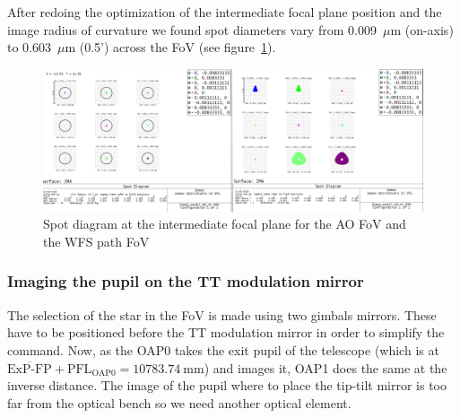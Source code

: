 \documentclass[12pt,a4paper]{article}
\begin{document}
After redoing the optimization of the intermediate focal plane position and the image radius of curvature we found spot diameters vary from 0.009~$\mu$m (on-axis) to 0.603~$\mu$m (0.5') across the FoV (see figure~\ref{fig:IntermediateFP_SpotDiagram}).\\
\begin{figure}[H]
	\begin{center}
		\includegraphics[width=.8\textwidth]{images/IntermediateFP_SpotDiagram.PNG}
		\caption{Spot diagram at the intermediate focal plane for the AO FoV and the WFS path FoV}\label{fig:IntermediateFP_SpotDiagram}
	\end{center}
\end{figure}

\subsubsection{Imaging the pupil on the TT modulation mirror}
The selection of the star in the FoV is made using two gimbals mirrors. These have to be positioned before the TT modulation mirror in order to simplify the command.
Now, as the OAP0 takes the exit pupil of the telescope (which is at  $\overline{\text{ExP-FP}}+\text{PFL}_{\text{OAP0}} = 10783.74~\text{mm}$) and images it, OAP1 does the same at the inverse distance. The image of the pupil where to place the tip-tilt mirror is too far from the optical bench so we need another optical element. 
\end{document}
